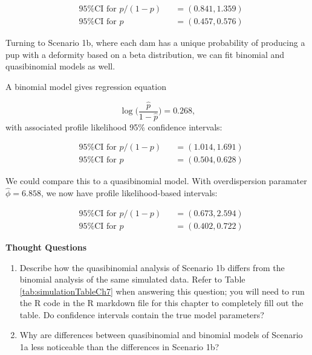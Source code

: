\documentclass[
]{krantz}
\begin{document}
\[
\begin{alignedat}{2}
  &\textrm{95\% CI for } p/(1-p) &&= (0.841, 1.359) \\
  &\textrm{95\% CI for } p       &&= (0.457, 0.576)
\end{alignedat}
\]

Turning to Scenario 1b, where each dam has a unique probability of producing a pup with a deformity based on a beta distribution, we can fit binomial and quasibinomial models as well.

A binomial model gives regression equation

\begin{equation*}
  \log\bigg(\frac{\hat{p}}{1-\hat{p}}\bigg) = 0.268,
\end{equation*}
with associated profile likelihood 95\% confidence intervals:

\[
\begin{alignedat}{2}
  &\textrm{95\% CI for } p/(1-p) &&= (1.014, 1.691) \\
  &\textrm{95\% CI for } p       &&= (0.504, 0.628)
\end{alignedat}
\]

We could compare this to a quasibinomial model. With overdispersion paramater \(\widehat{\phi} = 6.858\), we now have profile likelihood-based intervals:

\[
\begin{alignedat}{2}
  &\textrm{95\% CI for } p/(1-p) &&= (0.673, 2.594) \\
  &\textrm{95\% CI for } p       &&= (0.402, 0.722)
\end{alignedat}
\]

\vspace{5mm}

\textbf{Thought Questions}

\begin{enumerate}
\def\labelenumi{\arabic{enumi}.}
\setcounter{enumi}{3}
\item
  Describe how the quasibinomial analysis of Scenario 1b differs from the binomial analysis of the same simulated data. Refer to Table \ref{tab:simulationTableCh7} when answering this question; you will need to run the R code in the R markdown file for this chapter to completely fill out the table. Do confidence intervals contain the true model parameters?
\item
  Why are differences between quasibinomial and binomial models of Scenario 1a less noticeable than the differences in Scenario 1b?
\end{enumerate}
\end{document}
